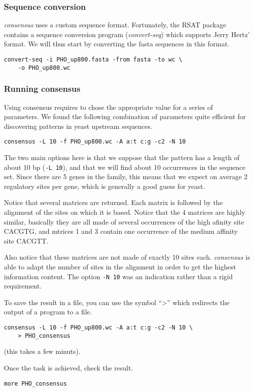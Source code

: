 \subsubsection{Sequence conversion}


\textit{consensus} uses a custom sequence format. Fortunately, the RSAT
package contains a sequence conversion program (\textit{convert-seq})
which supports Jerry Hertz' format. We will thus start by converting
the fasta sequences in this format. 

\begin{verbatim}
convert-seq -i PHO_up800.fasta -from fasta -to wc \ 
    -o PHO_up800.wc
\end{verbatim}

\subsubsection{Running consensus}

Using consensus requires to chose the appropriate value for a series
of parameters. We found the following combination of parameters quite
efficient for discovering patterns in yeast upstream sequences.

\begin{verbatim}
consensus -L 10 -f PHO_up800.wc -A a:t c:g -c2 -N 10
\end{verbatim}

The two main options here is that we suppose that the pattern has a
length of about 10 bp (\texttt{-L 10}), and that we will find about 10
occurrences in the sequence set. Since there are 5 genes in the
family, this means that we expect on average 2 regulatory sites per
gene, which is generally a good guess for yeast.

Notice that several matrices are returned. Each matrix is followed by
the alignment of the sites on which it is based. Notice that the 4
matrices are highly similar, basically they are all made of several
occurrences of the high afinity site CACGTG, and mtrices 1 and 3
contain one occurrence of the medium affinity site CACGTT. 

Also notice that these matrices are not made of exactly 10 sites
each. \textit{consensus} is able to adapt the number of sites in the
alignment in order to get the highest information content. The option
\texttt{-N 10} was an indication rather than a rigid requirement.

To save the result in a file, you can use the symbol ``>'' which
redirects the output of a program to a file. 

\begin{verbatim}
consensus -L 10 -f PHO_up800.wc -A a:t c:g -c2 -N 10 \
    > PHO_consensus
\end{verbatim}

(this takes a few minuts). 

Once the task is achieved, check the result.

\begin{verbatim}
more PHO_consensus
\end{verbatim}

